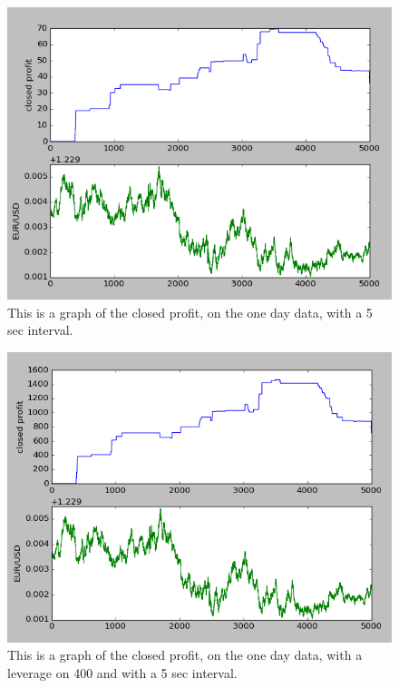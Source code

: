 \documentclass[10pt]{IEEEtran}
\begin{document}
\begin{figure}
    \includegraphics[scale = 0.5]{new2data-96-10000-20.png}
    \caption{This is a graph of the closed profit, on the one day data, with a 5 sec interval.}
\end{figure}

\begin{figure}
    \includegraphics[scale = 0.5]{new2data-96-10000-400.png}
    \caption{This is a graph of the closed profit, on the one day data, with a leverage on 400 and with a 5 sec interval.}
\end{figure}
\end{document}
